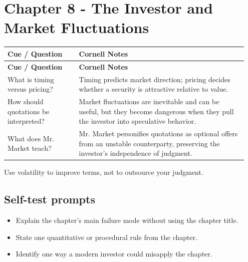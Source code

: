 \documentclass[11pt]{article}
\begin{document}
\section{Chapter 8 - The Investor and Market Fluctuations}
\begin{longtable}{@{}>{\raggedright\arraybackslash}p{0.29\linewidth}>{\raggedright\arraybackslash}p{0.66\linewidth}@{}}\toprule\textbf{Cue / Question} & \textbf{Cornell Notes}\\\midrule\endfirsthead\toprule\textbf{Cue / Question} & \textbf{Cornell Notes}\\\midrule\endhead
What is timing versus pricing? & Timing predicts market direction; pricing decides whether a security is attractive relative to value. \\
How should quotations be interpreted? & Market fluctuations are inevitable and can be useful, but they become dangerous when they pull the investor into speculative behavior. \\
What does Mr. Market teach? & Mr. Market personifies quotations as optional offers from an unstable counterparty, preserving the investor's independence of judgment. \\
\bottomrule\end{longtable}
\begin{principlebox}Use volatility to improve terms, not to outsource your judgment.\end{principlebox}
\subsection*{Self-test prompts}\begin{itemize}\item Explain the chapter's main failure mode without using the chapter title.\item State one quantitative or procedural rule from the chapter.\item Identify one way a modern investor could misapply the chapter.\end{itemize}
\end{document}
